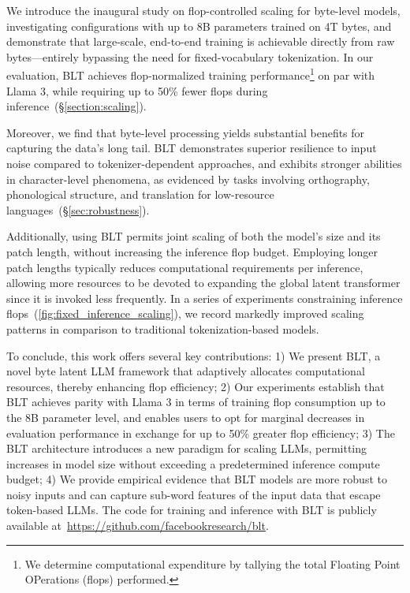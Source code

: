 We introduce the inaugural study on flop-controlled scaling for byte-level models, investigating configurations with up to 8B parameters trained on 4T bytes, and demonstrate that large-scale, end-to-end training is achievable directly from raw bytes—entirely bypassing the need for fixed-vocabulary tokenization. In our evaluation, {\textsc BLT} achieves flop-normalized training performance\footnote{We determine computational expenditure by tallying the total Floating Point OPerations (flops) performed.} on par with Llama 3, while requiring up to 50\% fewer flops during inference~(\S\ref{section:scaling}).

Moreover, we find that byte-level processing yields substantial benefits for capturing the data's long tail. {\textsc BLT} demonstrates superior resilience to input noise compared to tokenizer-dependent approaches, and exhibits stronger abilities in character-level phenomena, as evidenced by tasks involving orthography, phonological structure, and translation for low-resource languages~(\S\ref{sec:robustness}).

Additionally, using {\textsc BLT} permits joint scaling of both the model’s size and its patch length, without increasing the inference flop budget. Employing longer patch lengths typically reduces computational requirements per inference, allowing more resources to be devoted to expanding the global latent transformer since it is invoked less frequently. In a series of experiments constraining inference flops~(\autoref{fig:fixed_inference_scaling}), we record markedly improved scaling patterns in comparison to traditional tokenization-based models.

To conclude, this work offers several key contributions: 1) We present {\textsc BLT}, a novel byte latent LLM framework that adaptively allocates computational resources, thereby enhancing flop efficiency; 2) Our experiments establish that {\textsc BLT} achieves parity with Llama 3 in terms of training flop consumption up to the 8B parameter level, and enables users to opt for marginal decreases in evaluation performance in exchange for up to 50\% greater flop efficiency; 3) The {\textsc BLT} architecture introduces a new paradigm for scaling LLMs, permitting increases in model size without exceeding a predetermined inference compute budget; 4) We provide empirical evidence that {\textsc BLT} models are more robust to noisy inputs and can capture sub-word features of the input data that escape token-based LLMs. The code for training and inference with {\textsc BLT} is publicly available at~\url{https://github.com/facebookresearch/blt}.

